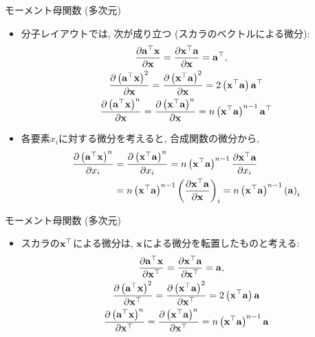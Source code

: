 \documentclass[dvipdfmx,notheorems,t]{beamer}
\begin{document}
\begin{frame}{モーメント母関数 (多次元)}
\begin{itemize}
  \item 分子レイアウトでは, 次が成り立つ (スカラのベクトルによる微分):
  \begin{gather*}
    \pdv{\vb{a}^\top \vb{x}}{\vb{x}}
      = \pdv{\vb{x}^\top \vb{a}}{\vb{x}}
      = \vb{a}^\top, \quad \\
    \pdv{\left( \vb{a}^\top \vb{x} \right)^2}{\vb{x}}
      = \pdv{\left( \vb{x}^\top \vb{a} \right)^2}{\vb{x}}
      = 2 \left( \vb{x}^\top \vb{a} \right) \vb{a}^\top \\
    \pdv{\left( \vb{a}^\top \vb{x} \right)^n}{\vb{x}}
      = \pdv{\left( \vb{x}^\top \vb{a} \right)^n}{\vb{x}}
      = n \left( \vb{x}^\top \vb{a} \right)^{n - 1} \vb{a}^\top
  \end{gather*}
  \item 各要素$x_i$に対する微分を考えると, 合成関数の微分から,
  \begin{align*}
    \pdv{\left( \vb{a}^\top \vb{x} \right)^n}{x_i}
    &= \pdv{\left( \vb{x}^\top \vb{a} \right)^n}{x_i}
    = n \left( \vb{x}^\top \vb{a} \right)^{n - 1} \pdv{\vb{x}^\top \vb{a}}{x_i} \\
    &= n \left( \vb{x}^\top \vb{a} \right)^{n - 1}
      \left( \pdv{\vb{x}^\top \vb{a}}{\vb{x}} \right)_i
    = n \left( \vb{x}^\top \vb{a} \right)^{n - 1} \left( \vb{a} \right)_i
  \end{align*}
\end{itemize}
\end{frame}

\begin{frame}{モーメント母関数 (多次元)}
\begin{itemize}
  \item スカラの$\vb{x}^\top$による微分は, $\vb{x}$による微分を転置したものと考える:
  \begin{gather*}
    \pdv{\vb{a}^\top \vb{x}}{\vb{x}^\top}
      = \pdv{\vb{x}^\top \vb{a}}{\vb{x}^\top}
      = \vb{a}, \quad \\
    \pdv{\left( \vb{a}^\top \vb{x} \right)^2}{\vb{x}^\top}
      = \pdv{\left( \vb{x}^\top \vb{a} \right)^2}{\vb{x}^\top}
      = 2 \left( \vb{x}^\top \vb{a} \right) \vb{a} \\
    \pdv{\left( \vb{a}^\top \vb{x} \right)^n}{\vb{x}^\top}
      = \pdv{\left( \vb{x}^\top \vb{a} \right)^n}{\vb{x}^\top}
      = n \left( \vb{x}^\top \vb{a} \right)^{n - 1} \vb{a}
  \end{gather*}
\end{itemize}
\end{frame}
\end{document}
